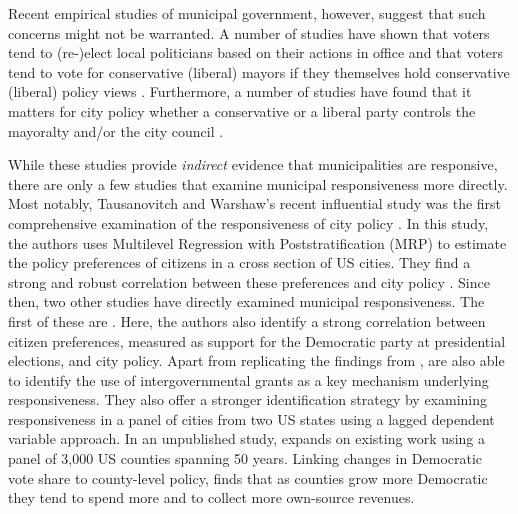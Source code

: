 \documentclass[a4paper,12pt]{article}
\begin{document}
Recent empirical studies of municipal government, however, suggest that such concerns might not be warranted.  A number of studies have shown that voters tend to (re-)elect local politicians based on their actions in office \citep{arnold2012holding,burnett2017politics,boyne2009democracy} and that voters tend to vote for conservative (liberal)  mayors if they themselves hold conservative (liberal) policy views  \citep{sances2017ideology,boudreau2015lost,hopkins2017retrospective}. Furthermore, a number of studies have found that it matters for city policy whether a conservative or a liberal party controls the mayoralty and/or the city council \citep{fiva2016power,folke2014shades,blom2006parties,de2016mayoral}. 

While these studies provide \textit{indirect} evidence that municipalities are responsive, there are only a few studies that examine municipal responsiveness more directly. Most notably, Tausanovitch and Warshaw's recent influential study  was the first comprehensive examination of the responsiveness of city policy \citep{tausanovitch2014representation}. In this study, the authors uses Multilevel Regression with Poststratification (MRP) to estimate the policy preferences of citizens in a cross section of US cities. They find a strong and robust correlation between these preferences and city policy \citep[see also][]{hajnal2010or,palus2010responsiveness}. Since then, two other studies have directly examined municipal responsiveness. The first of these are \cite{einstein2016pushing}. Here, the authors also identify a strong correlation between citizen preferences, measured as support for the Democratic party at presidential elections,  and city policy. Apart from replicating the findings from \citeauthor{tausanovitch2014representation}, \citeauthor{einstein2016pushing} are also able to identify the use of intergovernmental grants as a key mechanism underlying responsiveness. They also offer a stronger identification strategy by examining responsiveness in a panel of cities from two US states using a lagged dependent variable approach. In an unpublished study, \cite{sances2017voters} expands on existing work using a panel of 3,000 US counties spanning 50 years. Linking changes in Democratic vote share to county-level policy, \citeauthor{sances2017voters} finds that as counties grow more Democratic they tend to spend more and to collect more own-source revenues.
\end{document}
